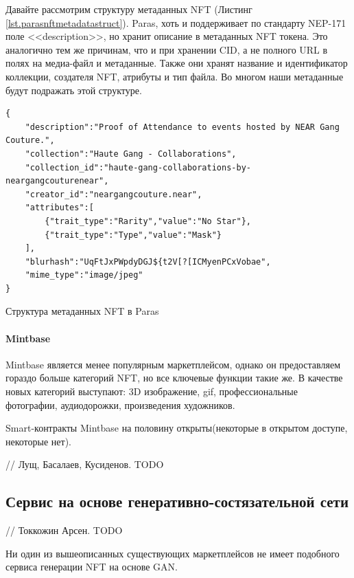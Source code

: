 Давайте рассмотрим структуру метаданных NFT (Листинг {\color{blue}\ref{lst.parasnftmetadatastruct}}). Paras, хоть и поддерживает по стандарту NEP-171 поле <<description>>, но хранит описание в метаданных NFT токена. Это аналогично тем же причинам, что и при хранении CID, а не полного URL в полях на медиа-файл и метаданные. Также они хранят название и идентификатор коллекции, создателя NFT, атрибуты и тип файла. Во многом наши метаданные будут подражать этой структуре.

\begin{listing}[H]
\begin{verbatim}
{
    "description":"Proof of Attendance to events hosted by NEAR Gang Couture.",
    "collection":"Haute Gang - Collaborations",
    "collection_id":"haute-gang-collaborations-by-neargangcouturenear",
    "creator_id":"neargangcouture.near",
    "attributes":[
        {"trait_type":"Rarity","value":"No Star"},
        {"trait_type":"Type","value":"Mask"}
    ],
    "blurhash":"UqFtJxPWpdyDGJ${t2V[?[ICMyenPCxVobae",
    "mime_type":"image/jpeg"
}
\end{verbatim}
\caption{Структура метаданных NFT в Paras}
\label{lst.parasnftmetadatastruct}
\end{listing}


\paragraph{Mintbase}

Mintbase является менее популярным маркетплейсом, однако он предоставляем гораздо больше категорий NFT, но все ключевые функции такие же. В качестве новых категорий выступают: 3D изображение, gif, профессиональные фотографии, аудиодорожки, произведения художников.

Smart-контракты Mintbase на половину открыты(некоторые в открытом доступе, некоторые нет)\cite{mintbasecontracts}.

// Лущ, Басалаев, Кусиденов. TODO

\subsection{Сервис на основе генеративно-состязательной сети}
// Токкожин Арсен. TODO

Ни один из вышеописанных существующих маркетплейсов не имеет подобного сервиса генерации NFT на основе GAN.
